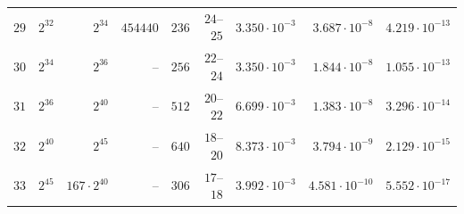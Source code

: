 {\begin{longtable}{@{}rrrrrrrrr@{}}
$29$ & $2^{32}$ & $2^{34}$ & $454440$ & $236$ & $24$--$25$ & $3.350\cdot10^{-3}$ & $3.687\cdot10^{-8}$ & $4.219\cdot10^{-13}$\\
$30$ & $2^{34}$ & $2^{36}$ & -- & $256$ & $22$--$24$ & $3.350\cdot10^{-3}$ & $1.844\cdot10^{-8}$ & $1.055\cdot10^{-13}$\\
$31$ & $2^{36}$ & $2^{40}$ & -- & $512$ & $20$--$22$ & $6.699\cdot10^{-3}$ & $1.383\cdot10^{-8}$ & $3.296\cdot10^{-14}$\\
$32$ & $2^{40}$ & $2^{45}$ & -- & $640$ & $18$--$20$ & $8.373\cdot10^{-3}$ & $3.794\cdot10^{-9}$ & $2.129\cdot10^{-15}$\\
$33$ & $2^{45}$ & $167\cdot2^{40}$ & -- & $306$ & $17$--$18$ & $3.992\cdot10^{-3}$ & $4.581\cdot10^{-10}$ & $5.552\cdot10^{-17}$\\
\end{longtable}
}

